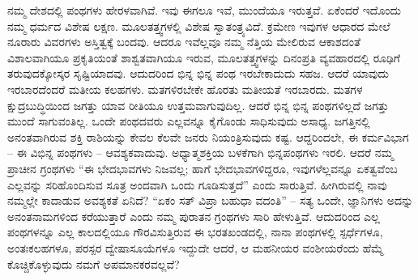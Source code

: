 \vskip 5pt

ನಮ್ಮ ದೇಶದಲ್ಲಿ ಪಂಥಗಳು ಹೇರಳವಾಗಿವೆ. ಇವು ಈಗಲೂ ಇವೆ, ಮುಂದೆಯೂ ಇರುತ್ತವೆ. ಏಕೆಂದರೆ ಇದೊಂದು ನಮ್ಮ ಧರ್ಮದ ವಿಶೇಷ ಲಕ್ಷಣ. ಮೂಲತತ್ತ್ವಗಳಲ್ಲಿ ವಿಶೇಷ ಸ್ವಾತಂತ್ರ್ಯವಿದೆ. ಕ್ರಮೇಣ ಇವುಗಳ ಆಧಾರದ ಮೇಲೆ ನೂರಾರು ವಿವರಗಳು ಅಸ್ತಿತ್ವಕ್ಕೆ ಬಂದವು. ಆದರೂ ಇವೆಲ್ಲವೂ ನಮ್ಮ ನೆತ್ತಿಯ ಮೇಲಿರುವ ಆಕಾಶದಂತೆ ವಿಶಾಲವಾಗಿಯೂ ಪ್ರಕೃತಿಯಂತೆ ಶಾಶ್ವತವಾಗಿಯೂ ಇರುವ, ಮೂಲತತ್ತ್ವಗಳನ್ನು ದಿನಂಪ್ರತಿ ವ್ಯವಹಾರದಲ್ಲಿ ರೂಢಿಗೆ ತರುವುದಕ್ಕೋಸ್ಕರ ಸೃಷ್ಟಿಯಾದವು. ಆದುದರಿಂದ ಭಿನ್ನ ಭಿನ್ನ ಪಂಥ ಇರಬೇಕಾದುದು ಸಹಜ. ಆದರೆ ಯಾವುದು ಇರಬಾರದೆಂದರೆ ಮತೀಯ ಕಲಹಗಳು. ಮತಗಳಿರಬೇಕೇ ಹೊರತು ಮತೀಯತೆ ಇರಬಾರದು. ಮತಗಳ ಕ್ಷುದ್ರಬುದ್ಧಿಯಿಂದ ಜಗತ್ತು ಯಾವ ರೀತಿಯೂ ಉತ್ತಮವಾಗುವುದಿಲ್ಲ. ಆದರೆ ಭಿನ್ನ ಭಿನ್ನ ಪಂಥಗಳಿಲ್ಲದೆ ಜಗತ್ತು ಮುಂದೆ ಸಾಗುವಂತಿಲ್ಲ. ಒಂದೇ ಪಂಥದವರು ಎಲ್ಲವನ್ನೂ ಕೈಗೊಂಡು ಸಾಧಿಸುವುದು ಅಸಾಧ್ಯ. ಜಗತ್ತಿನಲ್ಲಿ ಅನಂತವಾಗಿರುವ ಶಕ್ತಿ ರಾಶಿಯನ್ನು ಕೇವಲ ಕೆಲವೇ ಜನರು ನಿಯಂತ್ರಿಸುವುದು ಕಷ್ಟ. ಆದ್ದರಿಂದಲೇ, ಈ ಕರ್ಮವಿಭಾಗ – ಈ ವಿಭಿನ್ನ ಪಂಥಗಳು – ಆವಶ್ಯಕವಾದುವು. ಅಧ್ಯಾತ್ಮಶಕ್ತಿಯ ಬಳಕೆಗಾಗಿ ಭಿನ್ನಪಂಥಗಳು ಇರಲಿ. ಆದರೆ ನಮ್ಮ ಪ್ರಾಚೀನ ಗ್ರಂಥಗಳು “ಈ ಭೇದಭಾವಗಳು ನಿಜವಲ್ಲ; ಹಾಗೆ ಭೇದಭಾವಗಳಿದ್ದರೂ, ಇವುಗಳೆಲ್ಲವನ್ನೂ ಏಕತ್ವವೆಂಬ ಎಲ್ಲವನ್ನು ಸರಿಹೊಂದಿಸುವ ಸೂತ್ರ ಅಂದವಾಗಿ ಒಂದು ಗೂಡಿಸುತ್ತದೆ” ಎಂದು ಸಾರುತ್ತಿವೆ. ಹೀಗಿರುವಲ್ಲಿ ನಾವು ನಮ್ಮಲ್ಲೇ ಕಾದಾಡುವ ಅವಶ್ಯಕತೆ ಏನಿದೆ? “ಏಕಂ ಸತ್​ ವಿಪ್ರಾ ಬಹುಧಾ ವದಂತಿ” – ಸತ್ಯ ಒಂದೇ, ಜ್ಞಾನಿಗಳು ಅದನ್ನು ಅನಂತನಾಮಗಳಿಂದ ಕರೆಯುತ್ತಾರೆ ಎಂದು ನಮ್ಮ ಪುರಾತನ ಗ್ರಂಥಗಳು ಸಾರಿ ಹೇಳುತ್ತಿವೆ. ಆದುದರಿಂದ ಎಲ್ಲ ಪಂಥಗಳನ್ನೂ ಎಲ್ಲ ಕಾಲದಲ್ಲಿಯೂ ಗೌರವಿಸುತ್ತಿರುವ ಈ ಭರತಖಂಡದಲ್ಲಿ, ನಾನಾ ಪಂಥಗಳಲ್ಲಿ ಸ್ಪರ್ಧೆಗಳೂ, ಅಂತಃಕಲಹಗಳೂ, ಪರಸ್ಪರ ದ್ವೇಷಾಸೂಯೆಗಳೂ ಇದ್ದುದೇ ಆದರೆ, ಆ ಮಹನೀಯರ ವಂಶೀಯರೆಂದು ಹೆಮ್ಮೆ ಕೊಚ್ಚಿಕೊಳ್ಳುವುದು ನಮಗೆ ಅಪಮಾನಕರವಲ್ಲವೆ?

\vskip 5pt

